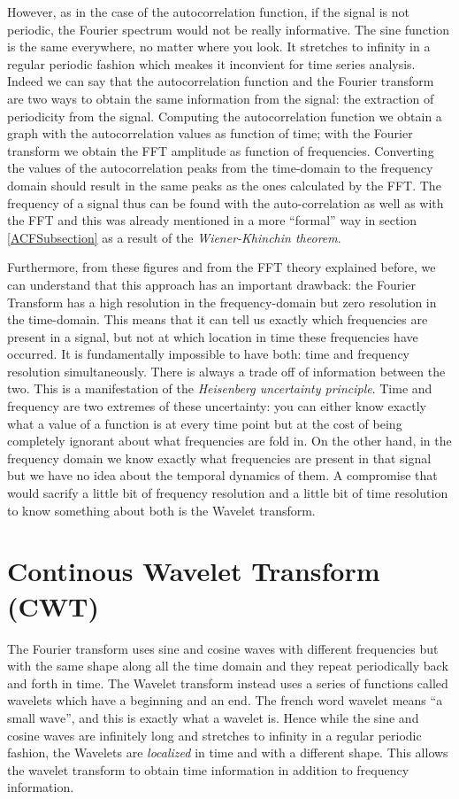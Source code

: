 \documentclass[12pt,a4paper]{report}
\begin{document}
However, as in the case of the autocorrelation function, if the signal is not periodic, the Fourier spectrum would not be really informative. The sine function is the same everywhere, no matter where you look. It stretches to infinity in a regular periodic fashion which meakes it inconvient for time series analysis. Indeed we can say that the autocorrelation function and the Fourier transform are two ways to obtain the same information from the signal: the extraction of periodicity from the signal. Computing the autocorrelation function we obtain a graph with the autocorrelation values as function of time; with the Fourier transform we obtain the FFT amplitude as function of frequencies. Converting the values of the autocorrelation peaks from the time-domain to the frequency domain should result in the same peaks as the ones calculated by the FFT. The frequency of a signal thus can be found with the auto-correlation as well as with the FFT and this was already mentioned in a more ``formal'' way in section \ref{ACFSubsection} as a result of the \emph{Wiener-Khinchin theorem}.


Furthermore, from these figures and from the FFT theory explained before, we can understand that this approach has an important drawback: the Fourier Transform has a high resolution in the frequency-domain but zero resolution in the time-domain. This means that it can tell us exactly which frequencies are present in a signal, but not at which location in time these frequencies have occurred. It is fundamentally impossible to have both: time and frequency resolution simultaneously. There is always a trade off of information between the two. This is a manifestation of the \emph{Heisenberg uncertainty principle}. Time and frequency are two extremes of these uncertainty: you can either know exactly what a value of a function is at every time point but at the cost of being completely ignorant about what frequencies are fold in. On the other hand, in the frequency domain we know exactly what frequencies are present in that signal but we have no idea about the temporal dynamics of them. A compromise that would sacrify a little bit of frequency resolution and a little bit of time resolution to know something about both is the Wavelet transform.




\section{Continous Wavelet Transform (CWT)}
The Fourier transform uses sine and cosine waves with different frequencies but with the same shape along all the time domain and they repeat periodically back and forth in time. The Wavelet transform instead uses a series of functions called wavelets which have a beginning and an end. The french word wavelet means ``a small wave'', and this is exactly what a wavelet is. Hence while the sine and cosine waves are infinitely long and stretches to infinity in a regular periodic fashion, the Wavelets are \emph{localized} in time and with a different shape. This allows the wavelet transform to obtain time information in addition to frequency information.
\end{document}
